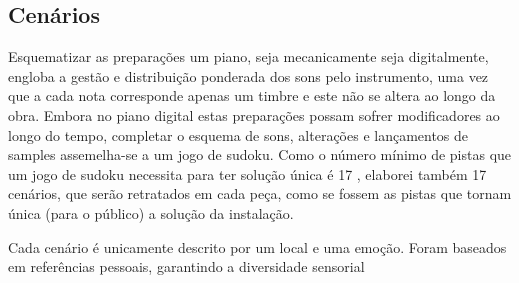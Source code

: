 \documentclass[../main.tex]{subfiles}
\begin{document}
\subsection*{Cenários}
Esquematizar as preparações um piano, seja mecanicamente seja digitalmente, engloba a gestão e distribuição ponderada dos sons pelo instrumento, uma vez que a cada nota corresponde apenas um timbre e este não se altera ao longo da obra.
Embora no piano digital estas preparações possam sofrer modificadores ao longo do tempo, completar o esquema de sons, alterações e lançamentos de samples assemelha-se a um jogo de sudoku.
Como o número mínimo de pistas que um jogo de sudoku necessita para ter solução única é 17 \cite{mcguire2012}, elaborei também 17 cenários, que serão retratados em cada peça, como se fossem as pistas que tornam única (para o público) a solução da instalação.

Cada cenário é unicamente descrito por um local e uma emoção. Foram baseados em referências pessoais, garantindo a diversidade sensorial
\end{document}
